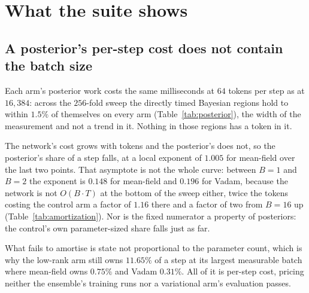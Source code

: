 \section{What the suite shows}
\label{sec:findings}


\subsection{A posterior's per-step cost does not contain the batch size}
\label{sec:find:flat}

Each arm's posterior work costs the same milliseconds at $64$ tokens per step as at
$16{,}384$: across the $256$-fold sweep the directly timed Bayesian regions hold to
within $1.5\%$ of themselves on every arm (Table~\ref{tab:posterior}), the width of
the measurement and not a trend in it. Nothing in those regions has a token in it.

The network's cost grows with tokens and the posterior's does not, so the
posterior's share of a step falls, at a local exponent of $1.005$ for mean-field
over the last two points. That asymptote is not the whole curve: between $B = 1$ and
$B = 2$ the exponent is $0.148$ for mean-field and $0.196$ for Vadam, because the
network is not $O(B \cdot T)$ at the bottom of the sweep either, twice the tokens
costing the control arm a factor of $1.16$ there and a factor of two from $B = 16$
up (Table~\ref{tab:amortization}). Nor is the fixed numerator a property of
posteriors: the control's own parameter-sized share falls just as far.

What fails to amortise is state not proportional to the parameter count, which is
why the low-rank arm still owns $11.65\%$ of a step at its largest measurable batch
where mean-field owns $0.75\%$ and Vadam $0.31\%$. All of it is per-step cost,
pricing neither the ensemble's training runs nor a variational arm's evaluation
passes.

\begin{table}[t]
  \centering
  \resizebox{\linewidth}{!}{}
  \caption{Each arm's own Bayesian work, timed at the launch sites, unfused. Share is
  the posterior over the whole step, $k$ the exponent in $\text{share} \propto B^{-k}$
  across the two smallest and the two largest points.}
  \label{tab:posterior}
\end{table}

